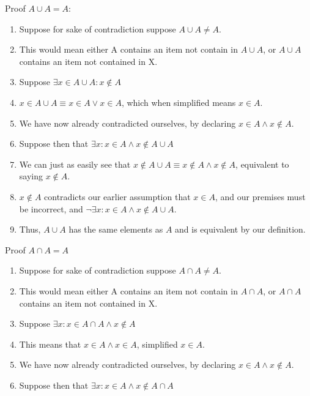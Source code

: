 \documentclass{article}
\begin{document}
\begin{enumerate}
            Proof $A \cup A = A$:
            \begin{enumerate}
                \item Suppose for sake of contradiction suppose $A \cup A \neq A$.
                \item This would mean either A contains an item not contain in $A \cup A$, or
                    $A \cup A$ contains an item not contained in X.
                \item Suppose $\exists x \in A \cup A : x \notin A$
                \item $x \in A \cup A \equiv x \in A \lor x \in A$, which when
                    simplified means $x \in A$.
                \item We have now already contradicted ourselves, by declaring
                    $x \in A \land x \notin A$.
                \item Suppose then that $\exists x : x \in A \land x \notin A \cup A$
                \item We can just as easily see that $x \notin A \cup A \equiv
                    x \notin A \land x \notin A$, equivalent to saying $x
                    \notin A$.
                \item $x \notin A$ contradicts our earlier assumption that $x \in A$, and our
                    premises must be incorrect, and $\neg\exists x : x \in A \land x \notin A \cup A$.
                \item Thus, $A \cup A$ has the same elements as $A$ and is
                    equivalent by our definition.
            \end{enumerate}
            Proof $A \cap A = A$
            \begin{enumerate}
                \item Suppose for sake of contradiction suppose $A \cap A \neq A$.
                \item This would mean either A contains an item not contain in
                    $A \cap A$, or $A \cap A$ contains an item not contained in
                    X.
                \item Suppose $\exists x : x \in A \cap A \land x \notin A$
                \item This means that $x \in A \land x \in A$, simplified $x
                    \in A$.
                \item We have now already contradicted ourselves, by declaring
                    $x \in A \land x \notin A$.
                \item Suppose then that $\exists x : x \in A \land x \notin A \cap A$

\end{enumerate}
\end{enumerate}
\end{document}
